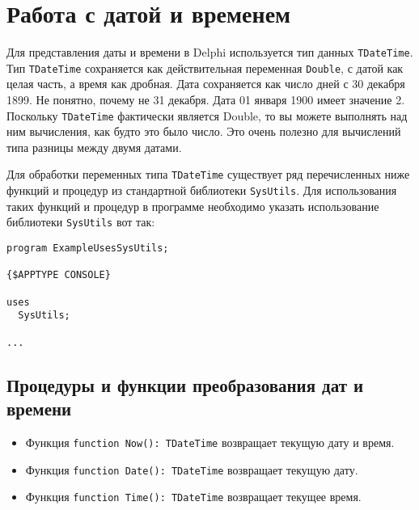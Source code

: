 \documentclass[12pt,a4paper]{report}
\begin{document}
\parindent=1cm
\pagestyle{empty}
\lstset{ language=Pascal, basicstyle=\small\ttfamily, numbers=left, numberstyle=\tiny, stepnumber=1, numbersep=5pt, extendedchars=\true, showstringspaces=false, breakatwhitespace=true, frame=single, keepspaces=true }


\section*{Работа с датой и временем}
Для представления даты и времени в Delphi используется тип данных \texttt{TDateTime}.
Тип \texttt{TDateTime} сохраняется как действительная переменная \texttt{Double}, с датой как целая часть, а время как дробная. Дата сохраняется как число дней с 30 декабря 1899. Не понятно, почему не 31 декабря. Дата 01 января 1900 имеет значение 2. 
Поскольку \texttt{TDateTime} фактически является Double, то вы можете выполнять над ним вычисления, как будто это было число. Это очень полезно для вычислений типа разницы между двумя датами.

Для обработки переменных типа \texttt{TDateTime} существует ряд перечисленных ниже функций и процедур из стандартной библиотеки \texttt{SysUtils}. Для использования таких функций и процедур в программе необходимо указать использование библиотеки \texttt{SysUtils} вот так:
\begin{verbatim}
program ExampleUsesSysUtils;

{$APPTYPE CONSOLE}

uses
  SysUtils;

...
\end{verbatim}

\subsection*{Процедуры и функции преобразования дат и времени}
\begin{itemize}
\item Функция \texttt{function Now(): TDateTime} возвращает текущую дату и время.
\item Функция \texttt{function Date(): TDateTime} возвращает текущую дату.
\item Функция \texttt{function Time(): TDateTime} возвращает текущее время.
\end{itemize}
\end{document}
